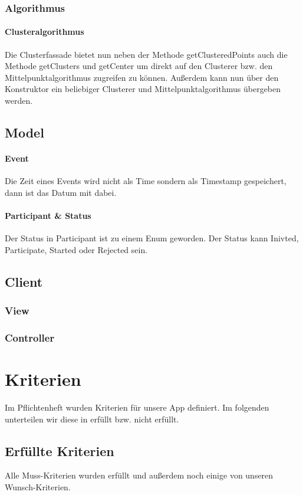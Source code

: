 \documentclass{scrartcl}
\begin{document}
	\subsubsection{Algorithmus}	
	\paragraph{Clusteralgorithmus}
	Die Clusterfassade bietet nun neben der Methode getClusteredPoints auch die Methode getClusters und getCenter um direkt auf den Clusterer bzw. den Mittelpunktalgorithmus zugreifen zu können. Außerdem kann nun über den Konstruktor ein beliebiger Clusterer und Mittelpunktalgorithmus übergeben werden.
	
	\subsection{Model}
	\paragraph{Event}
	Die Zeit eines Events wird nicht als Time sondern als Timestamp gespeichert, dann ist das Datum mit dabei.

	\paragraph{Participant \& Status}
	Der Status in Participant ist zu einem Enum geworden.
	Der Status kann Inivted, Participate, Started oder Rejected sein.
	
	\subsection{Client}
	\subsubsection{View}
	\subsubsection{Controller}
	\newpage
	\section{Kriterien}
	Im Pflichtenheft wurden Kriterien für unsere App definiert. Im folgenden unterteilen wir diese in erfüllt bzw. nicht erfüllt.

	
	\subsection{Erfüllte Kriterien}
		Alle Muss-Kriterien wurden erfüllt und außerdem noch einige von unseren Wunsch-Kriterien.
		
\end{document}
